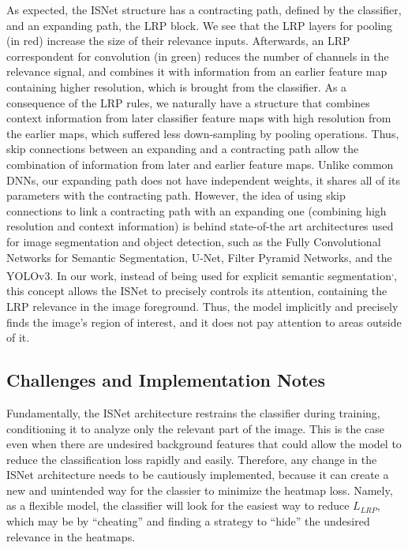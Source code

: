 \documentclass[fleqn,10pt]{wlscirep}
\begin{document}
{As expected, the ISNet structure has a contracting path, defined by the classifier, and an expanding path, the LRP block. We see that the LRP layers for pooling (in red) increase the size of their relevance inputs. Afterwards, an LRP correspondent for convolution (in green) reduces the number of channels in the relevance signal, and combines it with information from an earlier feature map containing higher resolution, which is brought from the classifier. As a consequence of the LRP rules, we naturally have a structure that combines context information from later classifier feature maps with high resolution from the earlier maps, which suffered less down-sampling by pooling operations. Thus, skip connections between an expanding and a contracting path allow the combination of information from later and earlier feature maps. Unlike common DNNs, our expanding path does not have independent weights, it shares all of its parameters with the contracting path. However, the idea of using skip connections to link a contracting path with an expanding one (combining high resolution and context information) is behind state-of-the art architectures used for image segmentation and object detection, such as the Fully Convolutional Networks for Semantic Segmentation\cite{SegmentationCNN}, U-Net\cite{unet}, Filter Pyramid Networks\cite{FPN}, and the YOLOv3\cite{yolov3}. In our work, instead of being used for explicit semantic segmentation\cite{SegmentationCNN}\textsuperscript{,}\cite{unet}, this concept allows the ISNet to precisely controls its attention, containing the LRP relevance in the image foreground. Thus, the model implicitly and precisely finds the image's region of interest, and it does not pay attention to areas outside of it.


\subsection{Challenges and Implementation Notes}
\label{ImpNotes}

Fundamentally, the ISNet architecture restrains the classifier during training, conditioning it to analyze only the relevant part of the image. This is the case even when there are undesired background features that could allow the model to reduce the classification loss rapidly and easily. Therefore, any change in the ISNet architecture needs to be cautiously implemented, because it can create a new and unintended way for the classier to minimize the heatmap loss. Namely, as a flexible model, the classifier will look for the easiest way to reduce $L_{LRP}$, which may be by ``cheating'' and finding a strategy to ``hide'' the undesired relevance in the heatmaps.

}
\end{document}
